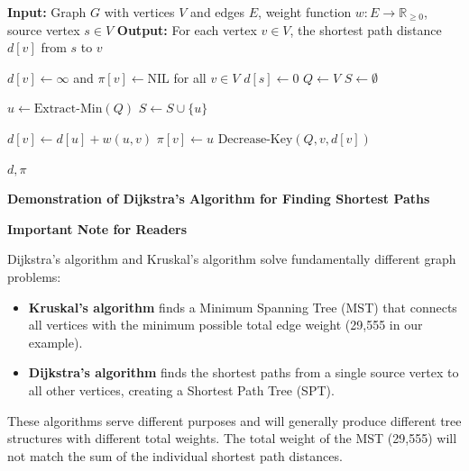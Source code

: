 \documentclass{article}
\theoremstyle{definition}
\begin{document}
\begin{algorithm}
\caption{Dijkstra's Algorithm}
\begin{algorithmic}[1]
    \State \textbf{Input:} Graph $G$ with vertices $V$ and edges $E$, weight function $w : E \rightarrow \mathbb{R}_{\geq 0}$, source vertex $s \in V$
    \State \textbf{Output:} For each vertex $v \in V$, the shortest path distance $d[v]$ from $s$ to $v$
    
    \State $d[v] \gets \infty$ and $\pi[v] \gets \text{NIL}$ for all $v \in V$ 
    \State $d[s] \gets 0$ 
    \State $Q \gets V$ 
    \State $S \gets \emptyset$ 
    
        \State $u \gets \text{Extract-Min}(Q)$ 
        \State $S \gets S \cup \{u\}$ 
        
             
                \State $d[v] \gets d[u] + w(u, v)$ 
                \State $\pi[v] \gets u$ 
                \State $\text{Decrease-Key}(Q, v, d[v])$ 
            \EndIf
        \EndFor
    \EndWhile
    
    \State \Return $d, \pi$ 
\EndProcedure
\end{algorithmic}
\end{algorithm}
\pagebreak

\noindent\textbf{Demonstration of Dijkstra's Algorithm for Finding Shortest Paths}

\begin{center}
\parbox{0.95\textwidth}{
\large\textbf{Important Note for Readers}

\normalsize Dijkstra's algorithm and Kruskal's algorithm solve fundamentally different graph problems:

\begin{itemize}
\item \textbf{Kruskal's algorithm} finds a Minimum Spanning Tree (MST) that connects all vertices with the minimum possible total edge weight (29,555 in our example).

\item \textbf{Dijkstra's algorithm} finds the shortest paths from a single source vertex to all other vertices, creating a Shortest Path Tree (SPT).
\end{itemize}

These algorithms serve different purposes and will generally produce different tree structures with different total weights. The total weight of the MST (29,555) will not match the sum of the individual shortest path distances.
}
\end{center}
\end{document}
